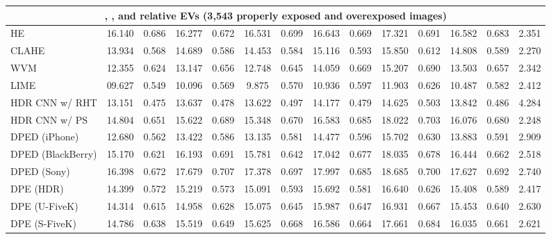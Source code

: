 \documentclass[final]{cvpr}
\begin{document}
\begin{table*}
\begin{center}
{\begin{tabular}{|l|c|c|c|c|c|c|c|c|c|c|c|c|c|}
\multicolumn{14}{|c|}{\cellcolor[HTML]{CCECEB}, , and  relative EVs (3,543 properly exposed and overexposed images)}\\ \hline
HE \cite{10.5555/559707} & 16.140 & \cellcolor[HTML]{FFCCCB}0.686 & 16.277 & 0.672 & 16.531 & 0.699 & 16.643 & 0.669 & 17.321  & 0.691 & 16.582 & 0.683 & 2.351\\
CLAHE \cite{adaptivehisteq} & 13.934 & 0.568 & 14.689 & 0.586 & 14.453 &  0.584 & 15.116 & 0.593 & 15.850 & 0.612 & 14.808 & 0.589 & 2.270\\
WVM \cite{fu2016weighted} & 12.355 & 0.624 & 13.147 & 0.656 & 12.748 & 0.645 & 14.059 & 0.669 & 15.207 & 0.690 & 13.503 & 0.657 & 2.342\\
\cellcolor[HTML]{D5D5D5}LIME \cite{guo2016lime, guo2017lime} & 09.627 & 0.549 & 10.096 & 0.569 & 9.875 & 0.570 & 10.936 & 0.597 & 11.903 & 0.626 & 10.487 & 0.582 & 2.412\\
HDR CNN \cite{HDRCNN} w/ RHT \cite{yang2018image}& 13.151 & 0.475 & 13.637 & 0.478 & 13.622 & 0.497 & 14.177 & 0.479 & 14.625 & 0.503 & 13.842 & 0.486 & 4.284\\
HDR CNN \cite{HDRCNN} w/ PS \cite{dayley2010photoshop}& 14.804  & 0.651 & 15.622 & 0.689 & 15.348 & 0.670 & 16.583  & 0.685 & 18.022 & \cellcolor[HTML]{FFCCCB}0.703 & 16.076 & 0.680 & \cellcolor[HTML]{FFCCCB}2.248\\
DPED (iPhone) \cite{DPED}& 12.680  &  0.562 & 13.422 & 0.586 & 13.135 & 0.581 & 14.477 & 0.596 & 15.702 & 0.630 & 13.883 & 0.591 & 2.909 \\
DPED (BlackBerry) \cite{DPED} & 15.170 & 0.621 & 16.193 & 0.691 &  15.781 & 0.642 & 17.042 & 0.677 & 18.035 & 0.678 & 16.444 & 0.662 & 2.518\\
DPED (Sony) \cite{DPED}& \cellcolor[HTML]{FFCCCB}16.398 & 0.672 & \cellcolor[HTML]{FFCCCB}17.679 & \cellcolor[HTML]{FFCCCB}0.707 & \cellcolor[HTML]{FFCCCB}17.378 & 0.697 & \cellcolor[HTML]{FFCCCB}17.997 & \cellcolor[HTML]{FFCCCB}0.685 & \cellcolor[HTML]{FFCCCB}18.685 & 0.700 & \cellcolor[HTML]{FFCCCB}17.627 & \cellcolor[HTML]{FFCCCB}0.692 & 2.740\\
DPE (HDR) \cite{DPE} & 14.399 & 0.572 & 15.219 & 0.573 & 15.091 & 0.593 & 15.692 & 0.581 & 16.640 & 0.626 & 15.408 & 0.589 & 2.417\\
DPE (U-FiveK) \cite{DPE} & 14.314 & 0.615 & 14.958 & 0.628 & 15.075 & 0.645 & 15.987 & 0.647 & 16.931 & 0.667 & 15.453 & 0.640 & 2.630\\
DPE (S-FiveK) \cite{DPE} & 14.786 & 0.638 & 15.519 & 0.649 & 15.625 &  0.668 & 16.586 & 0.664 &  17.661 & 0.684 & 16.035 & 0.661 & 2.621\\

\end{tabular}}
\end{center}
\end{table*}
\end{document}
